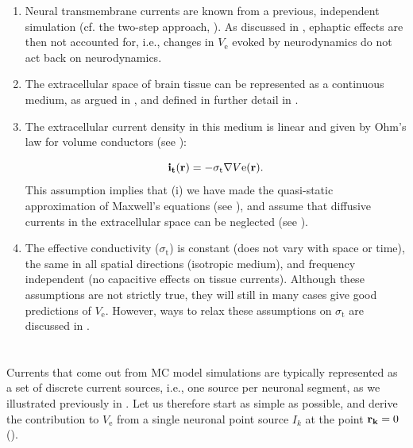 \begin{enumerate}
\item Neural transmembrane currents are known from a previous, 
independent simulation (cf. the two-step approach,  ). 
As discussed in , ephaptic effects are then
not accounted for, i.e., changes in $V_\mathrm{e}$ evoked by neurodynamics 
do not act back on neurodynamics.

\item The extracellular space of brain tissue can be represented as a continuous 
medium, as argued in , 
and defined in further detail in . 

\item The extracellular current density in this medium is linear and given by 
Ohm's law for volume conductors (see ):

\begin{equation}
{\bf i_t}({\bf r}) = - \sigma_\mathrm{t} \nabla V\mathrm{e}({\bf r}).
\label{eq:VC:ohmici}
\end{equation}
This assumption implies that (i) we have made the quasi-static approximation of Maxwell's equations (see ), and assume that diffusive currents in the extracellular space can be neglected
(see ).

\item The effective conductivity ($\sigma_\mathrm{t}$) is constant (does not vary with space or time), 
the same in all spatial directions (isotropic medium), and frequency independent (no capacitive effects on tissue currents).
Although these assumptions are not strictly true, they will still in many cases give good predictions 
of $V_\mathrm{e}$. However, ways to relax these assumptions on $\sigma_\mathrm{t}$ 
are discussed in .
\end{enumerate}


\section{}
\label{sec:VC:pointsource}
Currents that come out from MC model simulations are typically represented as 
a set of discrete current sources, i.e., one source per neuronal segment, as we illustrated previously in . Let us therefore start as simple as possible, 
and derive the contribution to $V_\mathrm{e}$ from a single neuronal point source 
$I_k$ at the point ${\bf r_k}=0$ ().

